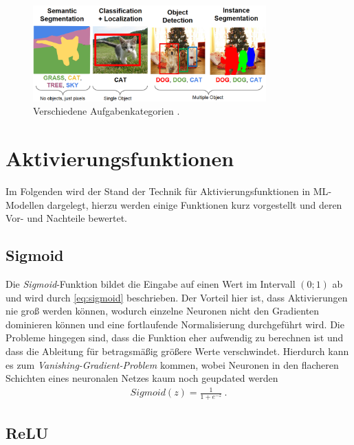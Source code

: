 \begin{figure}
	\centering
	\includegraphics[width=0.8\textwidth]{Bilder/categories.png} 
	\caption{Verschiedene Aufgabenkategorien \cite{.10.11.2022}.}
	\label{fig:categories}
\end{figure} 

\section{Aktivierungsfunktionen} \label{sec:activation}

Im Folgenden wird der Stand der Technik für Aktivierungsfunktionen in \ac{ML}-Modellen dargelegt,
hierzu werden einige Funktionen kurz vorgestellt und deren Vor- und Nachteile bewertet. 

\subsection{Sigmoid}

Die \textit{Sigmoid}-Funktion bildet die Eingabe auf einen Wert im Intervall $(0;1)$ ab und wird durch \autoref{eq:sigmoid} beschrieben.
Der Vorteil hier ist, dass Aktivierungen nie groß werden können, wodurch einzelne Neuronen nicht den Gradienten dominieren können und 
eine fortlaufende Normalisierung durchgeführt wird. Die Probleme hingegen sind, dass die Funktion eher aufwendig zu berechnen ist 
und dass die Ableitung für betragsmäßig größere Werte verschwindet. Hierdurch kann es zum \textit{Vanishing-Gradient-Problem} kommen, wobei 
Neuronen in den flacheren Schichten eines neuronalen Netzes kaum noch geupdated werden \cite{Goodfellow.2016} 
\begin{align}
	\label{eq:sigmoid} Sigmoid(z) = \frac{1}{1+e^{-z}}~.
\end{align} 

\subsection{\acf{ReLU}} \label{sec:activation:relu}

